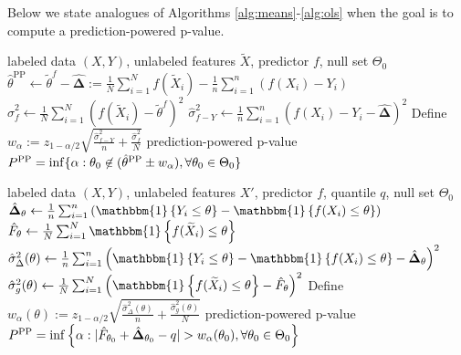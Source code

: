 \documentclass[10pt]{article}
\newcommand{\ind}[1]{\mathbbm{1}\left\{#1\right\}}
\newcommand{\tX}{\widetilde{X}}
\newcommand{\Xa}{X}
\newcommand{\Xt}{\widetilde{X}}
\newcommand{\Ya}{Y}
\newcommand{\thetaf}{\tilde{\theta}^{f}}
\newcommand{\thetaPP}{\hat{\theta}^{\mathrm{PP}}}
\newcommand{\rechat}{\hat{\mathbf{\Delta}}}
\begin{document}
Below we state analogues of Algorithms \ref{alg:means}-\ref{alg:ols} when the goal is to compute a prediction-powered p-value.


\begin{algorithm}[H]
\caption{Prediction-powered p-value for the mean}
\label{alg:means_pval}
\begin{algorithmic}[1]
\Require labeled data $(\Xa, \Ya)$, unlabeled features $\tX$, predictor $f$, null set $\Theta_0$
\State $\thetaPP \leftarrow \thetaf - \rechat := \frac{1}{N}\sum_{i=1}^N f(\Xt_i) - \frac{1}{n}\sum_{i=1}^n (f(X_i) - Y_i)$
\State $\hat \sigma_{f}^2 \leftarrow \frac 1 N \sum_{i=1}^N (f(\Xt_i) - \thetaf)^2$
\State $\hat \sigma_{f-Y}^2 \leftarrow \frac 1 n \sum_{i=1}^n (f(X_i) - Y_i - \rechat )^2$
\State Define $w_\alpha := z_{1-\alpha/2} \sqrt{\frac{\hat\sigma_{f-Y}^2}{n} + \frac{\hat\sigma_{f}^2}{N}}$
\Ensure 
prediction-powered p-value $P^{\rm PP} = \inf\{\alpha: \theta_0\not\in(\thetaPP \pm w_\alpha), \forall \theta_0\in\Theta_0\}$
\end{algorithmic}
\end{algorithm}


\vspace{-.3cm}

\begin{algorithm}[H]
\caption{Prediction-powered p-value for the quantile}
\label{alg:quantile_pval}
\begin{algorithmic}[1]
\Require labeled data $(\Xa, \Ya)$, unlabeled features $X'$, predictor $f$, quantile $q$, null set $\Theta_0$
\State $\rechat_\theta \leftarrow \frac{1}{n}\sum_{i=1}^n \left(\ind{Y_i \leq \theta} - \ind{f(X_i) \leq \theta}\right)$
\State $\hat F_\theta  \leftarrow \frac{1}{N}\sum_{i=1}^N  \ind{f(\Xt_i) \leq \theta}$
\State $\hat{\sigma}^2_{\Delta}(\theta)  \leftarrow \frac{1}{n}\sum_{i=1}^n\left(\ind{Y_i \leq \theta} - \ind{f(X_i) \leq \theta} - \rechat_\theta\right)^2$
\State $\hat{\sigma}_{g}^2(\theta) \gets \frac{1}{N}\sum_{i=1}^N\left(\ind{f(\Xt_i) \leq \theta} - \hat F_\theta \right)^2$
\State Define $w_\alpha(
\theta) := z_{1-\alpha/2}\sqrt{\frac{\hat{\sigma}^2_{\Delta}(\theta)}{n} + \frac{\hat{\sigma}^2_{g}(\theta)}{N}}$
\EndFor
\Ensure 
prediction-powered p-value $P^{\rm PP} = \inf\left\{ \alpha:  |\hat F_{\theta_0} + \rechat_{\theta_0} - q|  > w_{\alpha}(\theta_0), \forall \theta_0\in\Theta_0 \right\}$
\end{algorithmic}
\end{algorithm}
\end{document}
